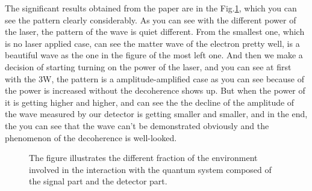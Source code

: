 \documentclass[final,1p,12pt]{elsarticle}
\begin{document}
The significant results obtained from the paper are in the Fig.\ref{333}, which you can see the pattern clearly considerably. As you can see with the different power of the laser, the pattern of the wave is quiet different. From the smallest one, which is no laser applied case, can see the matter wave of the electron pretty well, is a beautiful wave as the one in the figure of the most left one. And then we make a decision of starting turning on the power of the laser, and you can see at first with the 3W, the pattern is a amplitude-amplified case as you can see because of the power is increased without the decoherence shows up. But when the power of it is getting higher and higher, and can see the the decline of the amplitude of the wave measured by our detector is getting smaller and smaller, and in the end, the you can see that the wave can't be demonstrated obviously and the phenomenon of the decoherence is well-looked.\\ 
\begin{figure}
\begin{center}
\end{center}
\caption{The figure illustrates the different fraction of the environment involved in the interaction with the quantum system composed of the signal part and the detector part.}
\label{333}
\end{figure}
\end{document}
